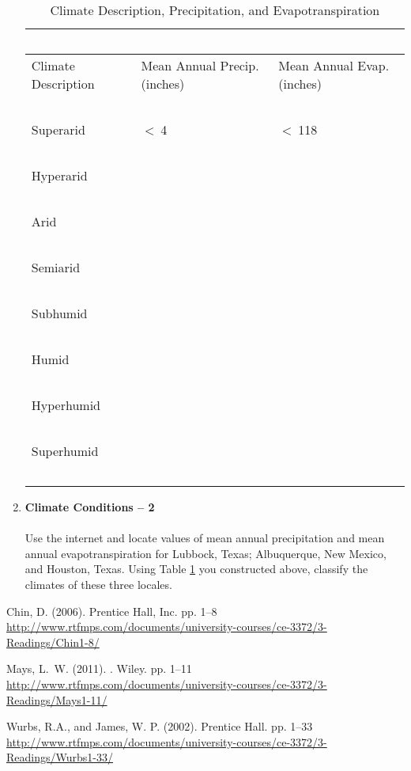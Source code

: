 \documentclass[12pt]{article}
\begin{document}
\begin{enumerate}
\begin{table}[htbp]
   \centering
   \caption{Climate Description, Precipitation, and Evapotranspiration}
   \begin{tabular}{p{1.5in}p{2.25in}p{2.25in}} %
   ~ & ~ & ~\\
\hline \hline
Climate Description & Mean Annual Precip. (inches) & Mean Annual Evap. (inches) \\
\hline
   ~ & ~ & ~\\
   Superarid & $<~$4 & $<~$118 \\
      ~ & ~ \\
   Hyperarid & & \\
   ~ & ~ \\   
   Arid && \\
   ~ & ~ \\   
   Semiarid && \\
   ~ & ~ \\   
   Subhumid && \\
   ~ & ~ \\   
   Humid && \\
   ~ & ~ \\   
   Hyperhumid && \\
   ~ & ~ \\   
   Superhumid && \\
   ~ & ~ \\   
\hline
\hline
   \end{tabular}
   \label{tab:climate}
\end{table}
\clearpage
\item{{\textbf{Climate Conditions -- 2}}}~\\~\\
Use the internet and locate values of mean annual precipitation and mean annual evapotranspiration for Lubbock, Texas; Albuquerque, New Mexico, and Houston, Texas.   Using Table \ref{tab:climate} you constructed above, classify the climates of these three locales.
\end{enumerate}






\begin{thebibliography}{\small}

Chin, D. (2006). 
\newblock Prentice Hall, Inc. {pp. 1--8} 
\newblock \url{http://www.rtfmps.com/documents/university-courses/ce-3372/3-Readings/Chin1-8/}

Mays, L.~W. (2011).
.
\newblock Wiley. {pp. 1--11}
\newblock \url{http://www.rtfmps.com/documents/university-courses/ce-3372/3-Readings/Mays1-11/}

Wurbs, R.A., and James, W. P. (2002).
\newblock Prentice Hall. {pp. 1--33}
\newblock \url{http://www.rtfmps.com/documents/university-courses/ce-3372/3-Readings/Wurbs1-33/}

\end{thebibliography}
\end{document}
